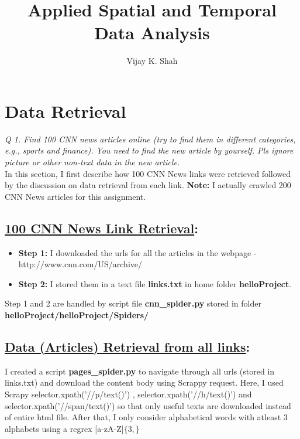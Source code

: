 \documentclass[journal,onecolumn]{IEEEtran}
\title{Applied Spatial and Temporal Data Analysis}
\author{ Vijay K. Shah}
\begin{document}
\maketitle

\section{\textbf{Data Retrieval}}

\textit{Q 1. Find 100 CNN news articles online (try to find them in different categories, e.g., sports and
finance). You need to find the new article by yourself. Pls ignore picture or other non-text data
in the new article.} \\

In this section, I first describe how 100 CNN News links were retrieved followed by the discussion on data retrieval from each link. \textbf{Note:} I actually crawled 200 CNN News articles for this assignment.

\subsection{\underline{100 CNN News Link Retrieval}:}

\begin{itemize}[label={}]
\item \textbf{Step 1:} I downloaded the urls for all the articles in the webpage - http://www.cnn.com/US/archive/

\item \textbf{Step 2:} I stored them in a text file \textbf{links.txt} in home folder \textbf{helloProject}. 

\end{itemize}
Step 1 and 2 are handled by script file \textbf{cnn\_spider.py} stored in folder \textbf{helloProject/helloProject/Spiders/}


\subsection{\underline{Data (Articles) Retrieval from all links}:}

I created a script \textbf{pages\_spider.py} to navigate through all urls (stored in links.txt) and download the content body using Scrappy request. Here, I used Scrapy selector.xpath('//p/text()') ,  selector.xpath('//h/text()') and  selector.xpath('//span/text()') so that only useful texts are downloaded instead of entire html file. After that, I only consider alphabetical words with atleast 3 alphabets using a regrex [a-zA-Z]$\{3,\}$ \\
\end{document}

